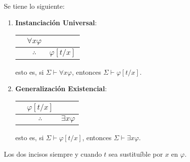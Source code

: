 \documentclass[12pt]{report}
\theoremstyle{largebreak}
\begin{document}
    \begin{theor}
        Se tiene lo siguiente:
        \begin{enumerate}
            \item \textbf{Instanciación Universal}:
            \begin{center}
                \begin{tabular}{c c c}
                    & $\forall x\varphi$  &  \\
                    \hline
                     & $\therefore$ & $\varphi[t/x]$ \\
                \end{tabular}
            \end{center}
            esto es, si $\Sigma\vdash\forall x\varphi$, entonces $\Sigma\vdash\varphi[t/x]$.
            \item \textbf{Generalización Existencial}:
            \begin{center}
                \begin{tabular}{c c c}
                    & $\varphi[t/x]$  &  \\
                    \hline
                     & $\therefore$ & $\exists x\varphi$ \\
                \end{tabular}
            \end{center}
            esto es, si $\Sigma\vdash\varphi[t/x]$, entonces $\Sigma\vdash\exists x\varphi$.
        \end{enumerate}
        Los dos incisos siempre y cuando $t$ sea sustituíble por $x$ en $\varphi$. 
    \end{theor}
\end{document}
